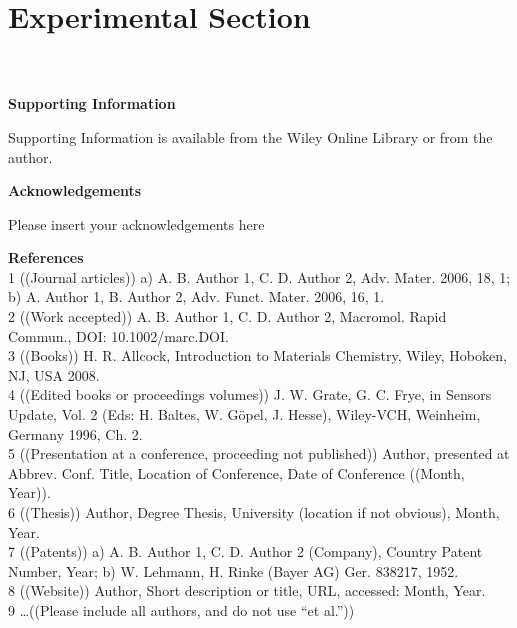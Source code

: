 \documentclass{WileyMSP-template}
\begin{document}

\section{Experimental Section}
\\
\\



\medskip
\textbf{Supporting Information} \par %
Supporting Information is available from the Wiley Online Library or from the author.



\medskip
\textbf{Acknowledgements} \par %
Please insert your acknowledgements here

\medskip

%
%
%

\textbf{References}\\

1	((Journal articles)) a) A. B. Author 1, C. D. Author 2, Adv. Mater. 2006, 18, 1; b) A. Author 1, B. Author 2, Adv. Funct. Mater. 2006, 16, 1.\\
2	((Work accepted)) A. B. Author 1, C. D. Author 2, Macromol. Rapid Commun., DOI: 10.1002/marc.DOI.\\
3	((Books)) H. R. Allcock, Introduction to Materials Chemistry, Wiley, Hoboken, NJ, USA 2008.\\
4	((Edited books or proceedings volumes)) J. W. Grate, G. C. Frye, in Sensors Update, Vol. 2 (Eds: H. Baltes, W. Göpel, J. Hesse), Wiley-VCH, Weinheim, Germany 1996, Ch. 2.\\
5	((Presentation at a conference, proceeding not published)) Author, presented at Abbrev. Conf. Title, Location of Conference, Date of Conference ((Month, Year)).\\
6	((Thesis)) Author, Degree Thesis, University (location if not obvious), Month, Year.\\
7	((Patents)) a) A. B. Author 1, C. D. Author 2 (Company), Country Patent Number, Year; b) W. Lehmann, H. Rinke (Bayer AG) Ger. 838217, 1952.\\
8	((Website)) Author, Short description or title, URL, accessed: Month, Year.\\
9	…((Please include all authors, and do not use “et al.”))\\
\end{document}
